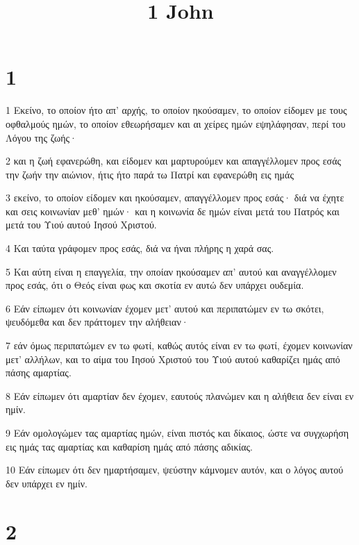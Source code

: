 

\title{1 John}


\chapter{1}

\par 1 Εκείνο, το οποίον ήτο απ' αρχής, το οποίον ηκούσαμεν, το οποίον είδομεν με τους οφθαλμούς ημών, το οποίον εθεωρήσαμεν και αι χείρες ημών εψηλάφησαν, περί του Λόγου της ζωής·
\par 2 και η ζωή εφανερώθη, και είδομεν και μαρτυρούμεν και απαγγέλλομεν προς εσάς την ζωήν την αιώνιον, ήτις ήτο παρά τω Πατρί και εφανερώθη εις ημάς
\par 3 εκείνο, το οποίον είδομεν και ηκούσαμεν, απαγγέλλομεν προς εσάς· διά να έχητε και σεις κοινωνίαν μεθ' ημών· και η κοινωνία δε ημών είναι μετά του Πατρός και μετά του Υιού αυτού Ιησού Χριστού.
\par 4 Και ταύτα γράφομεν προς εσάς, διά να ήναι πλήρης η χαρά σας.
\par 5 Και αύτη είναι η επαγγελία, την οποίαν ηκούσαμεν απ' αυτού και αναγγέλλομεν προς εσάς, ότι ο Θεός είναι φως και σκοτία εν αυτώ δεν υπάρχει ουδεμία.
\par 6 Εάν είπωμεν ότι κοινωνίαν έχομεν μετ' αυτού και περιπατώμεν εν τω σκότει, ψευδόμεθα και δεν πράττομεν την αλήθειαν·
\par 7 εάν όμως περιπατώμεν εν τω φωτί, καθώς αυτός είναι εν τω φωτί, έχομεν κοινωνίαν μετ' αλλήλων, και το αίμα του Ιησού Χριστού του Υιού αυτού καθαρίζει ημάς από πάσης αμαρτίας.
\par 8 Εάν είπωμεν ότι αμαρτίαν δεν έχομεν, εαυτούς πλανώμεν και η αλήθεια δεν είναι εν ημίν.
\par 9 Εάν ομολογώμεν τας αμαρτίας ημών, είναι πιστός και δίκαιος, ώστε να συγχωρήση εις ημάς τας αμαρτίας και καθαρίση ημάς από πάσης αδικίας.
\par 10 Εάν είπωμεν ότι δεν ημαρτήσαμεν, ψεύστην κάμνομεν αυτόν, και ο λόγος αυτού δεν υπάρχει εν ημίν.

\chapter{2}


